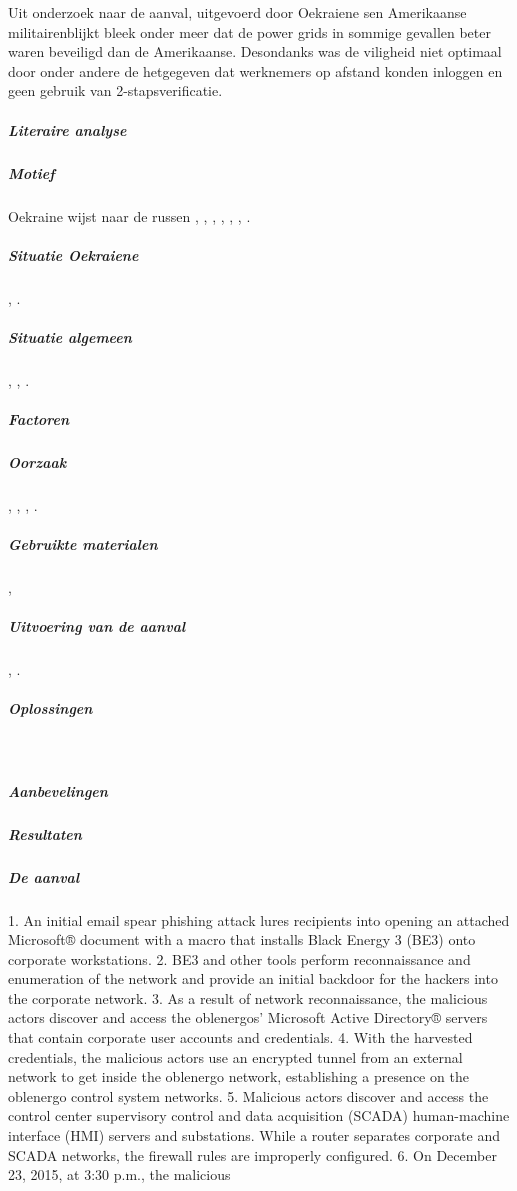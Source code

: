 Uit onderzoek\cite{zetter2016GridHack} naar de aanval,  uitgevoerd door Oekraiene sen Amerikaanse militairenblijkt  bleek onder meer dat de power grids in sommige gevallen beter waren beveiligd dan de Amerikaanse. Desondanks was de viligheid niet optimaal door onder andere de  hetgegeven dat werknemers op afstand konden inloggen en geen gebruik van 2-stapsverificatie.
\subparagraph{Literaire analyse}
\subparagraph{Motief}
Oekraine wijst naar de russen \cite{zetter2016GridHack}, 
\cite{greenberg2017Cyberwartestlab},
\cite{boozallen2016lightwentout},
\cite{finkle08012016russiansandwormhackers},
\cite{zinets15022017ukrainechargesrussia},
\cite{mcelfresh2016cyberattackhowandwhy},
\cite{parkwalstorm11102017russiagridattack}.
\subparagraph{Situatie Oekraiene}
\cite{drago2017CrashOverride},
\cite{slowik2019ReassasUkraine2016Attack}.
\subparagraph{Situatie algemeen}
\cite{cerulus2019FrontlineRussiaAttack},
\cite{desarnaud2017cyberattacks},
\cite{dragos2019TargetedTransStation}.
\subparagraph{Factoren}
\cite{shehod2016gridadvantageus}
\subparagraph{Oorzaak}
\cite{rocha2017cybersecyrityanalysisScada},
\cite{2017crashoverridenostuxnet},
\cite{vijayan2017firstmalwareCausedOutage},
\cite{slowik2019ReassasUkraine2016Attack}.
\subparagraph{Gebruikte materialen}
\cite{2015ukrainegridattack},
\cite{industroyershortfact}
\subparagraph{Uitvoering van de aanval}
\cite{Whitehead2017ukrainepoweroutage},
\cite{boozallen2016lightwentout}.
\subparagraph{Oplossingen}
~\cite{Whitehead2017ukrainepoweroutage}
\subparagraph{Aanbevelingen}
\subparagraph{Resultaten}
\subparagraph{De aanval}
1. An initial email spear phishing attack lures recipients
into opening an attached Microsoft® document with a
macro that installs Black Energy 3 (BE3) onto
corporate workstations.
2. BE3 and other tools perform reconnaissance and
enumeration of the network and provide an initial
backdoor for the hackers into the corporate network.
3. As a result of network reconnaissance, the malicious
actors discover and access the oblenergos’ Microsoft
Active Directory® servers that contain corporate user
accounts and credentials.
4. With the harvested credentials, the malicious actors use
an encrypted tunnel from an external network to get
inside the oblenergo network, establishing a presence
on the oblenergo control system networks.
5. Malicious actors discover and access the control center
supervisory control and data acquisition (SCADA)
human-machine interface (HMI) servers and
substations. While a router separates corporate and
SCADA networks, the firewall rules are improperly
configured.
6. On December 23, 2015, at 3:30 p.m., the malicious
